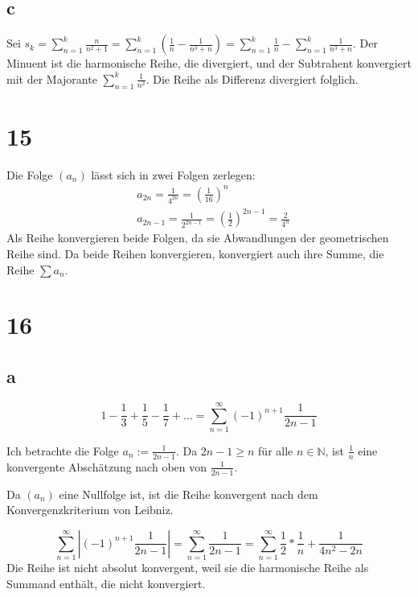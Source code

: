 \documentclass[a4paper,10pt]{article}
\begin{document}
\subsection*{c}

Sei $s_k = \sum_{n = 1}^k \frac{n}{n^2 + 1} = \sum_{n = 1}^k (\frac{1}{n} - \frac{1}{n^3 + n}) = \sum_{n = 1}^k \frac{1}{n} - \sum_{n = 1}^k \frac{1}{n^3 + n}$.
Der Minuent ist die harmonische Reihe, die divergiert, und der Subtrahent konvergiert mit der Majorante $\sum_{n = 1}^k \frac{1}{n^2}$.
Die Reihe als Differenz divergiert folglich.

\section*{15}

Die Folge $(a_n)$ lässt sich in zwei Folgen zerlegen:
\begin{align}
 & a_{2n} = \frac{1}{4^{2n}} = (\frac{1}{16})^n\\
 & a_{2n - 1} = \frac{1}{2^{2n - 1}} = (\frac{1}{2})^{2n - 1} = \frac{2}{4^n}
\end{align}
Als Reihe konvergieren beide Folgen, da sie Abwandlungen der geometrischen Reihe sind.
Da beide Reihen konvergieren, konvergiert auch ihre Summe, die Reihe $\sum a_n$.



\section*{16}

\subsection*{a}

\begin{equation}
 1 - \frac{1}{3} + \frac{1}{5} - \frac{1}{7} + \dots = \sum_{n = 1}^\infty (-1)^{n + 1}\frac{1}{2n - 1}
\end{equation}

Ich betrachte die Folge $a_n := \frac{1}{2n - 1}$.
Da $2n - 1 \ge n$ für alle $n \in \mathbb{N}$, ist $\frac{1}{n}$ eine konvergente Abschätzung nach oben von $\frac{1}{2n - 1}$.

Da $(a_n)$ eine Nullfolge ist, ist die Reihe konvergent nach dem Konvergenzkriterium von Leibniz.

\begin{equation}
 \sum_{n = 1}^\infty |(-1)^{n + 1}\frac{1}{2n - 1}| = \sum_{n = 1}^\infty \frac{1}{2n - 1} = \sum_{n = 1}^\infty \frac{1}{2} * \frac{1}{n} + \frac{1}{4n^2 - 2n}
\end{equation}
Die Reihe ist nicht absolut konvergent, weil sie die harmonische Reihe als Summand enthält, die nicht konvergiert.
\end{document}
